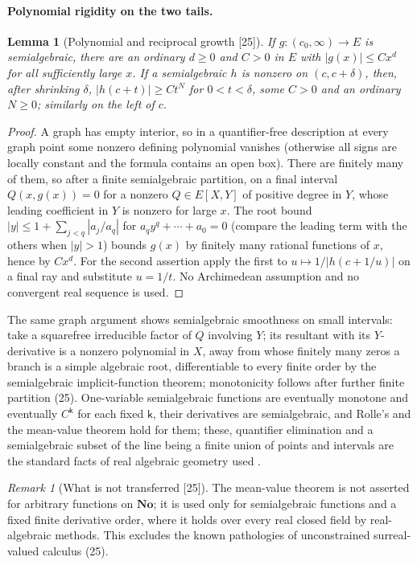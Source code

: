 \documentclass[11pt,letterpaper]{article}
\numberwithin{equation}{section}
\newtheorem{lemma}[lemma]{Lemma}
\theoremstyle{definition}
\theoremstyle{remark}
\newtheorem{remark}[remark]{Remark}
\theoremstyle{plain}
\newcommand{\No}{\mathbf{No}}
\newcommand{\src}[1]{\textup{\textsf{[#1]}}}
\begin{document}
\paragraph{Polynomial rigidity on the two tails.}

\begin{lemma}[Polynomial and reciprocal growth \src{25}]\label{osq:sa:lem:growth}
If $g:(c_0,\infty)\to E$ is semialgebraic, there are an ordinary $d\ge0$ and $C>0$ in $E$ with $|g(x)|\le Cx^d$ for all sufficiently large $x$. If a
semialgebraic $h$ is nonzero on $(c,c+\delta)$, then, after shrinking $\delta$, $|h(c+t)|\ge Ct^N$ for $0<t<\delta$, some $C>0$ and an ordinary $N\ge0$;
similarly on the left of $c$.
\end{lemma}
\begin{proof}
A graph has empty interior, so in a quantifier-free description at every graph point some nonzero defining polynomial vanishes (otherwise all signs are
locally constant and the formula contains an open box). There are finitely many of them, so after a finite semialgebraic partition, on a final interval
$Q(x,g(x))=0$ for a nonzero $Q\in E[X,Y]$ of positive degree in $Y$, whose leading coefficient in $Y$ is nonzero for large $x$. The root bound
$|y|\le1+\sum_{j<q}|a_j/a_q|$ for $a_qy^q+\cdots+a_0=0$ (compare the leading term with the others when $|y|>1$) bounds $g(x)$ by finitely many rational
functions of $x$, hence by $Cx^d$. For the second assertion apply the first to $u\mapsto1/|h(c+1/u)|$ on a final ray and substitute $u=1/t$. No
Archimedean assumption and no convergent real sequence is used.
\end{proof}

The same graph argument shows semialgebraic smoothness on small intervals: take a squarefree irreducible factor of $Q$ involving $Y$; its resultant with
its $Y$-derivative is a nonzero polynomial in $X$, away from whose finitely many zeros a branch is a simple algebraic root, differentiable to every finite
order by the semialgebraic implicit-function theorem; monotonicity follows after further finite partition (25). One-variable semialgebraic functions are
eventually monotone and eventually $C^{\mathsf k}$ for each fixed $\mathsf k$, their derivatives are semialgebraic, and Rolle's and the mean-value theorem
hold for them; these, quantifier elimination and a semialgebraic subset of the line being a finite union of points and intervals are the standard facts of
real algebraic geometry used \cite{BCR}.

\begin{remark}[What is not transferred \src{25}]\label{osq:sa:rem:calculus}
The mean-value theorem is not asserted for arbitrary functions on $\No$; it is used only for semialgebraic functions and a fixed finite derivative order,
where it holds over every real closed field by real-algebraic methods. This excludes the known pathologies of unconstrained surreal-valued calculus (25).
\end{remark}
\end{document}

